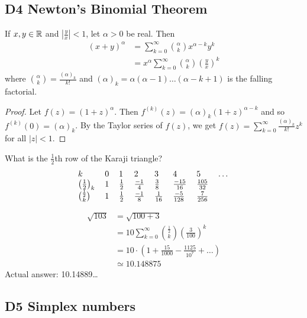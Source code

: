 \documentclass[12pt]{article}
\begin{document}
\subsection{D4 Newton's Binomial Theorem}

\begin{theorem}[Newton]
    If $x,y\in \mathbb{R}$ and $|\frac{y}{x}|<1$, let $\alpha>0$ be real. Then \begin{align*}
        (x+y)^\alpha &= \sum_{k=0}^{\infty}{\alpha\choose k}x^{\alpha-k}y^k\\
        &= x^\alpha \sum_{k=0}^{\infty}{\alpha\choose k} \left(\frac{y}{x}\right)^k
    \end{align*}
    where ${\alpha\choose k}= \frac{(\alpha)_k}{k!}$ and $(\alpha)_k=\alpha(\alpha-1)\dots (\alpha-k+1)$ is the falling factorial.
\end{theorem}
\begin{proof}
    Let $f(z)=(1+z)^\alpha$. Then $f^{(k)}(z)=(\alpha)_k(1+z)^{\alpha-k}$ and so $f^{(k)}(0)=(\alpha)_k$. By the Taylor series of $f(z)$, we get $f(z)=\sum_{k=0}^{\infty}\frac{(\alpha)_k}{k!}z^k$ for all $|z|<1$.
\end{proof}

\eg What is the $\frac{1}{2}$th row of the Karaji triangle?
\[\begin{tabular}{llllllll}
    $k$    & 0 & 1 & 2 & 3 & 4 & 5 & \dots \\
    $\left(\frac{1}{2}\right)_k$ & 1  & $\frac{1}{2}$  & $\frac{-1}{4}$  & $\frac{3}{8}$  & $\frac{-15}{16}$  & $\frac{105}{32}$  &      \\
    ${\frac{1}{2}\choose k}$ &  1 & $\frac{1}{2}$  & $\frac{-1}{8}$  & $\frac{1}{16}$  & $\frac{-5}{128}$  & $\frac{7}{256}$  &     
    \end{tabular}\]

\eg \begin{align*}
    \sqrt{103} &= \sqrt{100+3}\\
    &= 10\sum_{k=0}^{\infty}{\frac{1}{2}\choose k}\left(\frac{3}{100}\right)^k\\
    &= 10\cdot (1+\frac{15}{1000}-\frac{1125}{10^7}+\dots)\\
    &\simeq 10.148875
\end{align*}
Actual answer: 10.14889\dots

\subsection{D5 Simplex numbers}
\end{document}

